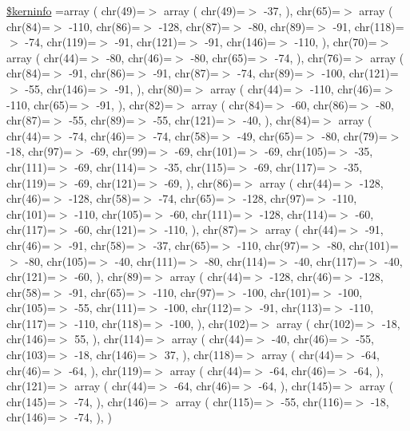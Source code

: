 \begin{DoxyCompactItemize}
\hyperlink{ctimes_8php_ab4bb7d3b0332c517f6a42a1924f01000}{\$kerninfo} =array ( chr(49)=$>$ array ( chr(49)=$>$ -\/37, ), chr(65)=$>$ array ( chr(84)=$>$ -\/110, chr(86)=$>$ -\/128, chr(87)=$>$ -\/80, chr(89)=$>$ -\/91, chr(118)=$>$ -\/74, chr(119)=$>$ -\/91, chr(121)=$>$ -\/91, chr(146)=$>$ -\/110, ), chr(70)=$>$ array ( chr(44)=$>$ -\/80, chr(46)=$>$ -\/80, chr(65)=$>$ -\/74, ), chr(76)=$>$ array ( chr(84)=$>$ -\/91, chr(86)=$>$ -\/91, chr(87)=$>$ -\/74, chr(89)=$>$ -\/100, chr(121)=$>$ -\/55, chr(146)=$>$ -\/91, ), chr(80)=$>$ array ( chr(44)=$>$ -\/110, chr(46)=$>$ -\/110, chr(65)=$>$ -\/91, ), chr(82)=$>$ array ( chr(84)=$>$ -\/60, chr(86)=$>$ -\/80, chr(87)=$>$ -\/55, chr(89)=$>$ -\/55, chr(121)=$>$ -\/40, ), chr(84)=$>$ array ( chr(44)=$>$ -\/74, chr(46)=$>$ -\/74, chr(58)=$>$ -\/49, chr(65)=$>$ -\/80, chr(79)=$>$ -\/18, chr(97)=$>$ -\/69, chr(99)=$>$ -\/69, chr(101)=$>$ -\/69, chr(105)=$>$ -\/35, chr(111)=$>$ -\/69, chr(114)=$>$ -\/35, chr(115)=$>$ -\/69, chr(117)=$>$ -\/35, chr(119)=$>$ -\/69, chr(121)=$>$ -\/69, ), chr(86)=$>$ array ( chr(44)=$>$ -\/128, chr(46)=$>$ -\/128, chr(58)=$>$ -\/74, chr(65)=$>$ -\/128, chr(97)=$>$ -\/110, chr(101)=$>$ -\/110, chr(105)=$>$ -\/60, chr(111)=$>$ -\/128, chr(114)=$>$ -\/60, chr(117)=$>$ -\/60, chr(121)=$>$ -\/110, ), chr(87)=$>$ array ( chr(44)=$>$ -\/91, chr(46)=$>$ -\/91, chr(58)=$>$ -\/37, chr(65)=$>$ -\/110, chr(97)=$>$ -\/80, chr(101)=$>$ -\/80, chr(105)=$>$ -\/40, chr(111)=$>$ -\/80, chr(114)=$>$ -\/40, chr(117)=$>$ -\/40, chr(121)=$>$ -\/60, ), chr(89)=$>$ array ( chr(44)=$>$ -\/128, chr(46)=$>$ -\/128, chr(58)=$>$ -\/91, chr(65)=$>$ -\/110, chr(97)=$>$ -\/100, chr(101)=$>$ -\/100, chr(105)=$>$ -\/55, chr(111)=$>$ -\/100, chr(112)=$>$ -\/91, chr(113)=$>$ -\/110, chr(117)=$>$ -\/110, chr(118)=$>$ -\/100, ), chr(102)=$>$ array ( chr(102)=$>$ -\/18, chr(146)=$>$ 55, ), chr(114)=$>$ array ( chr(44)=$>$ -\/40, chr(46)=$>$ -\/55, chr(103)=$>$ -\/18, chr(146)=$>$ 37, ), chr(118)=$>$ array ( chr(44)=$>$ -\/64, chr(46)=$>$ -\/64, ), chr(119)=$>$ array ( chr(44)=$>$ -\/64, chr(46)=$>$ -\/64, ), chr(121)=$>$ array ( chr(44)=$>$ -\/64, chr(46)=$>$ -\/64, ), chr(145)=$>$ array ( chr(145)=$>$ -\/74, ), chr(146)=$>$ array ( chr(115)=$>$ -\/55, chr(116)=$>$ -\/18, chr(146)=$>$ -\/74, ), )
\end{DoxyCompactItemize}


